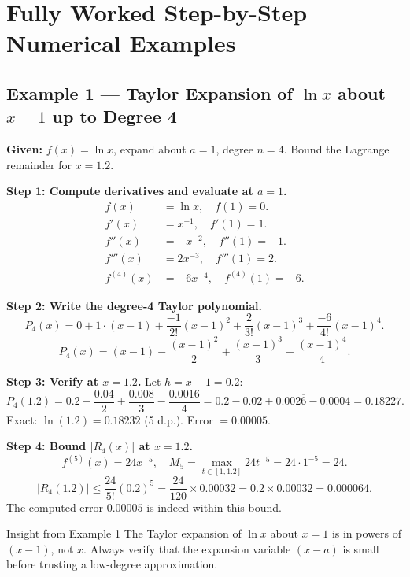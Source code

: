 \documentclass[12pt,a4paper]{article}
\begin{document}
\section{Fully Worked Step-by-Step Numerical Examples}

\subsection*{Example 1 --- Taylor Expansion of \(\ln x\) about \(x=1\) up to Degree 4}

\textbf{Given:} \(f(x) = \ln x\), expand about \(a = 1\), degree \(n = 4\).
Bound the Lagrange remainder for \(x = 1.2\).

\medskip
\textbf{Step 1: Compute derivatives and evaluate at \(a = 1\).}
\begin{align*}
  f(x)    &= \ln x,                \quad f(1)    = 0. \\
  f'(x)   &= x^{-1},               \quad f'(1)   = 1. \\
  f''(x)  &= -x^{-2},              \quad f''(1)  = -1. \\
  f'''(x) &= 2x^{-3},              \quad f'''(1) = 2. \\
  f^{(4)}(x) &= -6x^{-4},         \quad f^{(4)}(1) = -6.
\end{align*}

\textbf{Step 2: Write the degree-4 Taylor polynomial.}
\[
  P_4(x) = 0 + 1\cdot(x-1) + \frac{-1}{2!}(x-1)^2 + \frac{2}{3!}(x-1)^3
           + \frac{-6}{4!}(x-1)^4.
\]
\[
  P_4(x) = (x-1) - \frac{(x-1)^2}{2} + \frac{(x-1)^3}{3} - \frac{(x-1)^4}{4}.
\]

\textbf{Step 3: Verify at \(x = 1.2\).}
Let \(h = x - 1 = 0.2\):
\[
  P_4(1.2) = 0.2 - \frac{0.04}{2} + \frac{0.008}{3} - \frac{0.0016}{4}
           = 0.2 - 0.02 + 0.002\overline{6} - 0.0004
           = 0.18227.
\]
Exact: \(\ln(1.2) = 0.18232\) (5 d.p.).  Error \(= 0.00005\).

\textbf{Step 4: Bound \(|R_4(x)|\) at \(x = 1.2\).}
\[
  f^{(5)}(x) = 24x^{-5}, \quad
  M_5 = \max_{t \in [1,1.2]} 24t^{-5} = 24 \cdot 1^{-5} = 24.
\]
\[
  |R_4(1.2)| \leq \frac{24}{5!}(0.2)^5
             = \frac{24}{120} \times 0.00032
             = 0.2 \times 0.00032
             = 0.000064.
\]
The computed error \(0.00005\) is indeed within this bound.

\begin{learnbox}{Insight from Example 1}
The Taylor expansion of \(\ln x\) about \(x=1\) is in powers of \((x-1)\), not
\(x\).
Always verify that the expansion variable \((x-a)\) is small before trusting a
low-degree approximation.
\end{learnbox}
\end{document}
